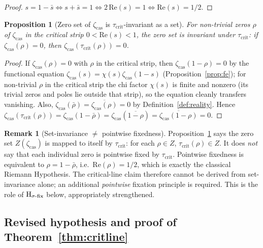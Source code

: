 \documentclass[11pt, a4paper]{amsart}
\newtheorem{proposition}[theorem]{Proposition}
\theoremstyle{definition}
\newtheorem{remark}[theorem]{Remark}
\newcommand{\zetacas}{\zeta_{\mathrm{cas}}}
\begin{document}
\begin{proof}
$s = 1 - \bar{s} \iff s + \bar{s} = 1 \iff 2\,\mathrm{Re}(s) = 1 \iff \mathrm{Re}(s) = 1/2$.
\end{proof}

\begin{proposition}[Zero set of $\zetacas$ is $\tau_{\mathrm{crit}}$-invariant as a set]\label{prop:zeroset-tau}
For non-trivial zeros $\rho$ of $\zetacas$ in the critical strip
$0 < \mathrm{Re}(s) < 1$, the zero set is invariant under
$\tau_{\mathrm{crit}}$: if $\zetacas(\rho) = 0$, then
$\zetacas(\tau_{\mathrm{crit}}(\rho)) = 0$.
\end{proposition}

\begin{proof}
If $\zetacas(\rho) = 0$ with $\rho$ in the critical strip, then
$\zetacas(1 - \rho) = 0$ by the functional equation
$\zetacas(s) = \chi(s) \zetacas(1-s)$
(Proposition~\ref{prop:fe}); for non-trivial $\rho$ in the critical
strip the chi factor $\chi(s)$ is finite and nonzero (its trivial
zeros and poles lie outside that strip), so the equation cleanly
transfers vanishing. Also, $\zetacas(\bar{\rho}) = \overline{\zetacas(\rho)} = 0$
by Definition~\ref{def:reality}. Hence
$\zetacas(\tau_{\mathrm{crit}}(\rho)) = \zetacas(1 - \bar{\rho}) =
\zetacas(\overline{1 - \rho}) = \overline{\zetacas(1-\rho)} = 0$.
\end{proof}

\begin{remark}[Set-invariance $\neq$ pointwise fixedness]\label{rmk:set-vs-point}
Proposition~\ref{prop:zeroset-tau} says the zero set
$Z(\zetacas)$ is mapped to itself by $\tau_{\mathrm{crit}}$: for each
$\rho \in Z$, $\tau_{\mathrm{crit}}(\rho) \in Z$. It does \emph{not}
say that each individual zero is pointwise fixed by
$\tau_{\mathrm{crit}}$. Pointwise fixedness is
equivalent to $\rho = 1 - \bar{\rho}$, i.e.\ $\mathrm{Re}(\rho) =
1/2$, which is exactly the classical Riemann Hypothesis. The
critical-line claim therefore cannot be derived from
set-invariance alone; an additional \emph{pointwise} fixation
principle is required. This is the role of
$\textup{H}_{\sigma\text{-fix}}$ below, appropriately
strengthened.
\end{remark}

\subsection{Revised hypothesis and proof of Theorem~\ref{thm:critline}}
\end{document}
